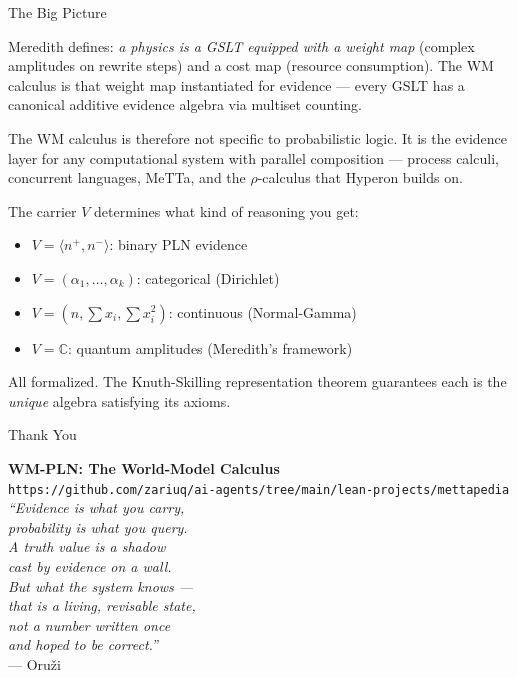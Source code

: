 \documentclass[aspectratio=169,11pt]{beamer}
\begin{document}
\begin{frame}{The Big Picture}

Meredith defines: \emph{a physics is a GSLT equipped with a
weight map} (complex amplitudes on rewrite steps) and a cost map
(resource consumption). The WM calculus is that weight map
instantiated for evidence --- every GSLT has a canonical additive
evidence algebra via multiset counting.

\bigskip
The WM calculus is therefore not specific to probabilistic logic.
It is the \alert{evidence layer for any computational system}
with parallel composition --- process calculi, concurrent
languages, MeTTa, and the $\rho$-calculus that Hyperon builds on.

\bigskip
The carrier $V$ determines what kind of reasoning you get:
\begin{itemize}
\item $V = \langle n^+, n^- \rangle$: binary PLN evidence
\item $V = (\alpha_1, \ldots, \alpha_k)$: categorical (Dirichlet)
\item $V = (n, \sum x_i, \sum x_i^2)$: continuous (Normal-Gamma)
\item $V = \mathbb{C}$: quantum amplitudes (Meredith's framework)
\end{itemize}
All formalized.  The Knuth-Skilling representation theorem
guarantees each is the \emph{unique} algebra satisfying its
axioms.

\end{frame}

\begin{frame}{Thank You}

\begin{center}
\large\textbf{WM-PLN: The World-Model Calculus}\\[12pt]

\normalsize
\texttt{https://github.com/zariuq/ai-agents/tree/main/lean-projects/mettapedia}\\[12pt]

\textit{``Evidence is what you carry,\\
probability is what you query.\\[4pt]
A truth value is a shadow\\
cast by evidence on a wall.\\
But what the system knows ---\\
that is a living, revisable state,\\
not a number written once\\
and hoped to be correct.''}\\[6pt]
--- Oru\v{z}i
\end{center}

\end{frame}
\end{document}
